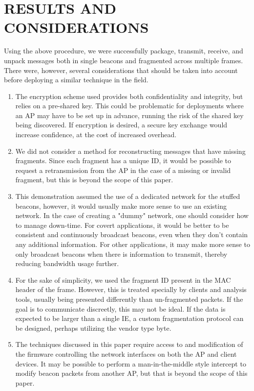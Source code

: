 \documentclass[letterpaper, 10 pt, conference]{ieeeconf}  %
\begin{document}
\section{RESULTS AND CONSIDERATIONS}

Using the above procedure, we were successfully package, transmit, receive, and unpack messages both in single beacons and fragmented across multiple frames.  There were, however, several considerations that should be taken into account before deploying a similar technique in the field.

\begin{enumerate}
\item The encryption scheme used provides both confidentiality and integrity, but relies on a pre-shared key.  This could be problematic for deployments where an AP may have to be set up in advance, running the risk of the shared key being discovered.  If encryption is desired, a secure key exchange would increase confidence, at the cost of increased overhead.
\item We did not consider a method for reconstructing messages that have missing fragments.  Since each fragment has a unique ID, it would be possible to request a retransmission from the AP in the case of a missing or invalid fragment, but this is beyond the scope of this paper.
\item This demonstration assumed the use of a dedicated network for the stuffed beacons, however, it would usually make more sense to use an existing network.  In the case of creating a "dummy" network, one should consider how to manage down-time.  For covert applications, it would be better to be consistent and continuously broadcast beacons, even when they don't contain any additional information.  For other applications, it may make more sense to only broadcast beacons when there is information to transmit, thereby reducing bandwidth usage further.
\item For the sake of simplicity, we used the fragment ID present in the MAC header of the frame.  However, this is treated specially by clients and analysis tools, usually being presented differently than un-fragmented packets.  If the goal is to communicate discreetly, this may not be ideal.  If the data is expected to be larger than a single IE, a custom fragmentation protocol can be designed, perhaps utilizing the vendor type byte.
\item The techniques discussed in this paper require access to and modification of the firmware controlling the network interfaces on both the AP and client devices.  It may be possible to perform a man-in-the-middle style intercept to modify beacon packets from another AP, but that is beyond the scope of this paper.

\end{enumerate}
\end{document}
